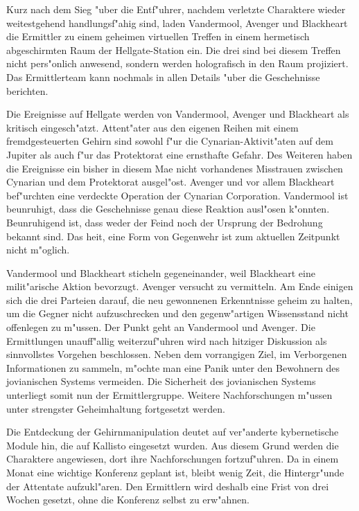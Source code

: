 
Kurz nach dem Sieg "uber die Entf"uhrer, nachdem verletzte Charaktere wieder weitestgehend handlungsf"ahig sind, laden Vandermool, Avenger und Blackheart die Ermittler zu einem geheimen virtuellen Treffen in einem hermetisch abgeschirmten Raum der Hellgate-Station ein. Die drei sind bei diesem Treffen nicht pers"onlich anwesend, sondern werden holografisch in den Raum projiziert. Das Ermittlerteam kann nochmals in allen Details "uber die Geschehnisse berichten.

Die Ereignisse auf Hellgate werden von Vandermool, Avenger und Blackheart als kritisch eingesch"atzt. Attent"ater aus den eigenen Reihen mit einem fremdgesteuerten Gehirn sind sowohl f"ur die Cynarian-Aktivit"aten auf dem Jupiter als auch f"ur das Protektorat eine ernsthafte Gefahr. Des Weiteren haben die Ereignisse ein bisher in diesem Ma\3e nicht vorhandenes Misstrauen zwischen Cynarian und dem Protektorat ausgel"ost. Avenger und vor allem Blackheart bef"urchten eine verdeckte Operation der Cynarian Corporation. Vandermool ist beunruhigt, dass die Geschehnisse genau diese Reaktion ausl"osen k"onnten. Beunruhigend ist, dass weder der Feind noch der Ursprung der Bedrohung bekannt sind. Das hei\3t, eine Form von Gegenwehr ist zum aktuellen Zeitpunkt nicht m"oglich.

Vandermool und Blackheart sticheln gegeneinander, weil Blackheart eine milit"arische Aktion bevorzugt. Avenger versucht zu vermitteln. Am Ende einigen sich die drei Parteien darauf, die neu gewonnenen Erkenntnisse geheim zu halten, um die Gegner nicht aufzuschrecken und den gegenw"artigen Wissensstand nicht offenlegen zu m"ussen. Der Punkt geht an Vandermool und Avenger. Die Ermittlungen unauff"allig weiterzuf"uhren wird nach hitziger Diskussion als sinnvollstes Vorgehen beschlossen. Neben dem vorrangigen Ziel, im Verborgenen Informationen zu sammeln, m"ochte man eine Panik unter den Bewohnern des jovianischen Systems vermeiden. Die Sicherheit des jovianischen Systems unterliegt somit nun der Ermittlergruppe. Weitere Nachforschungen m"ussen unter strengster Geheimhaltung fortgesetzt werden.

Die Entdeckung der Gehirnmanipulation deutet auf ver"anderte kybernetische Module hin, die auf Kallisto eingesetzt wurden. Aus diesem Grund werden die Charaktere angewiesen, dort ihre Nachforschungen fortzuf"uhren. Da in einem Monat eine wichtige Konferenz geplant ist, bleibt wenig Zeit, die Hintergr"unde der Attentate aufzukl"aren. Den Ermittlern wird deshalb eine Frist von drei Wochen gesetzt, ohne die Konferenz selbst zu erw"ahnen.

